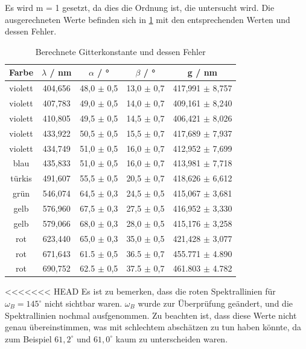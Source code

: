 Es wird m = 1 gesetzt, da dies die Ordnung ist, die untersucht wird.
Die
 ausgerechneten Werte befinden sich in \cref{tab:gitterkonstante} mit den entsprechenden  Werten und dessen Fehler.
\begin{table}[htbp]
    \centering
    \begin{tabular}{|c|c|c|c|c|}
        Farbe & $\lambda$ / nm & $\alpha$ / ° & $\beta$ / ° & g / nm \\
        \hline 
        violett & 404,656 & 48,0 $\pm$ 0,5 & 13,0 $\pm$ 0,7 & 417,991 $\pm$ 8,757 \\
        violett & 407,783 & 49,0 $\pm$ 0,5 & 14,0 $\pm$ 0,7 & 409,161 $\pm$ 8,240 \\
        violett & 410,805 & 49,5 $\pm$ 0,5 & 14,5 $\pm$ 0,7 & 406,421 $\pm$ 8,026 \\
        violett & 433,922 & 50,5 $\pm$ 0,5 & 15,5 $\pm$ 0,7 & 417,689 $\pm$ 7,937 \\
        violett & 434,749 & 51,0 $\pm$ 0,5 & 16,0 $\pm$ 0,7 & 412,952 $\pm$ 7,699 \\
        blau & 435,833 & 51,0 $\pm$ 0,5 & 16,0 $\pm$ 0,7 & 413,981 $\pm$ 7,718 \\
        türkis & 491,607 & 55,5 $\pm$ 0,5 & 20,5 $\pm$ 0,7 & 418,626 $\pm$ 6,612 \\
        grün & 546,074 & 64,5 $\pm$ 0,3 & 24,5 $\pm$ 0,5 & 415,067 $\pm$ 3,681 \\
        gelb & 576,960 & 67,5 $\pm$ 0,3 & 27,5 $\pm$ 0,5 & 416,952 $\pm$ 3,330 \\
        gelb & 579,066 & 68,0 $\pm$ 0,3 & 28,0 $\pm$ 0,5 & 415,176 $\pm$ 3,258 \\
        rot & 623,440 & 65,0 $\pm$ 0,3 & 35,0 $\pm$ 0,5 & 421,428 $\pm$ 3,077 \\
        rot & 671,643 & 61.5 $\pm$ 0,5 & 36.5 $\pm$ 0,7 & 455.771 $\pm$ 4.890 \\
        rot & 690,752 & 62.5 $\pm$ 0,5 & 37.5 $\pm$ 0,7 & 461.803 $\pm$ 4.782 
    \end{tabular}
    \caption{Berechnete Gitterkonstante und dessen Fehler}
    \label{tab:gitterkonstante}
\end{table}
<<<<<<< HEAD
Es ist zu bemerken, dass die roten Spektrallinien für $\omega_B = 145^\circ$ nicht sichtbar waren. $\omega_B$ wurde zur Überprüfung geändert, und die Spektrallinien nochmal ausfgenommen. 
Zu beachten ist, dass diese Werte nicht genau übereinstimmen, was mit schlechtem abschätzen zu tun haben könnte, da zum Beispiel $61,2^\circ$ und $61,0^\circ$ kaum zu unterscheiden waren.

